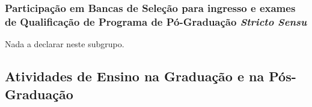 \documentclass[a4paper,oneside,10pt]{article}
\begin{document}
\begin{enumerate}
%
\end{enumerate}


\subsubsection{Participa\c{c}\~{a}o em Bancas de Sele\c{c}\~{a}o para ingresso e exames de Qualifica\c{c}\~ao de Programa de P\'{o}-Gradua\c{c}\~{a}o \textit{Stricto Sensu}}

Nada a declarar neste subgrupo.
%
%


\subsection{Atividades de Ensino na Graduação e na Pós-Graduação}
\vspace{0.3cm}
\end{document}
